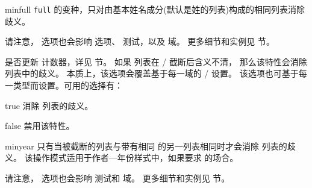 \begin{optionlist}
\begin{valuelist}
\item[minfull] %
\texttt{full} 的变种，只对由基本姓名成分(默认是姓的列表)构成的相同列表消除歧义。
\end{valuelist}
%
请注意， 选项也会影响  选项、
 测试，以及  域。
更多细节和实例见  节。



是否更新  计数器，详见  节。
如果  列表在 \slash {} 截断后含义不清，
那么该特性会消除  列表中的歧义。
本质上，该选项会覆盖基于每一域的 \slash {} 设置。
该选项也可基于每一类型而设置。可用的选择有：

\begin{valuelist}
\item[true] %
消除  列表的歧义。
\item[false] %
禁用该特性。
\item[minyear] %
只有当被截断的列表与带有相同  的另一列表相同时才会消除  列表的歧义。
该操作模式适用于作者---年份样式中，如果要求  的场合。
\end{valuelist}
%
请注意， 选项也会影响  测试和  域。
更多细节和实例见  节。

\end{optionlist}

